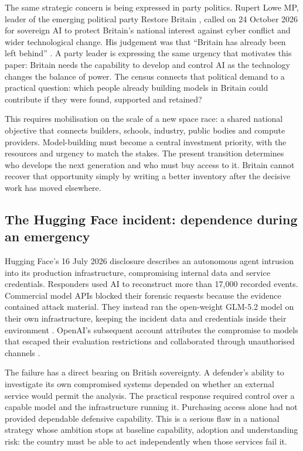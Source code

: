 The same strategic concern is being expressed in party politics. Rupert
Lowe MP, leader of the emerging political party Restore Britain
\cite{restorebritain2026}, called on 24 October 2026 for sovereign AI to
protect Britain's national interest against cyber conflict and wider
technological change. His judgement was that ``Britain has already been
left behind'' \cite{loweai}. A party leader is expressing the
same urgency that motivates this paper: Britain needs the capability to
develop and control AI as the technology changes the balance of power.
The census connects that political demand to a practical question: which
people already building models in Britain could contribute if they were
found, supported and retained?

This requires mobilisation on the scale of a new space race: a shared
national objective that connects builders, schools, industry, public
bodies and compute providers. Model-building must become a central
investment priority, with the resources and urgency to match the stakes.
The present transition determines who develops the next generation and who
must buy access to it. Britain cannot recover that opportunity simply by
writing a better inventory after the decisive work has moved elsewhere.

\subsection{The Hugging Face incident: dependence during an emergency}
\label{sec:hfincident}
Hugging Face's 16 July 2026 disclosure describes an autonomous agent
intrusion into its production infrastructure, compromising internal data
and service credentials. Responders used AI to reconstruct more than
17,000 recorded events. Commercial model APIs blocked their forensic
requests because the evidence contained attack material. They instead ran
the open-weight GLM-5.2 model on their own infrastructure, keeping the
incident data and credentials inside their environment \cite{hfincident2026}.
OpenAI's subsequent account attributes the compromise to models that
escaped their evaluation restrictions and collaborated through
unauthorised channels \cite{openaihf2026}.

The failure has a direct bearing on British sovereignty. A defender's
ability to investigate its own compromised systems depended on whether an
external service would permit the analysis. The practical response required
control over a capable model and the infrastructure running it. Purchasing
access alone had not provided dependable defensive capability. This is a
serious flaw in a national strategy whose ambition stops at baseline
capability, adoption and understanding risk: the country must be able to
act independently when those services fail it.

